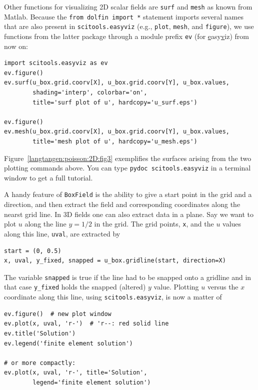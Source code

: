 Other functions for visualizing 2D scalar fields are {\fontsize{12pt}{12pt}\texttt{surf}} and
{\fontsize{12pt}{12pt}\texttt{mesh}} as known from Matlab. Because the {\fontsize{12pt}{12pt}\texttt{from dolfin import *}}
statement imports several names that are also present
in {\fontsize{12pt}{12pt}\texttt{scitools.easyviz}} (e.g., {\fontsize{12pt}{12pt}\texttt{plot}}, {\fontsize{12pt}{12pt}\texttt{mesh}}, and
{\fontsize{12pt}{12pt}\texttt{figure}}), we use functions from the latter package through a
module prefix {\fontsize{12pt}{12pt}\texttt{ev}} (for \underline{e}asy\underline{v}iz) from now on:
\begin{Verbatim}[fontsize=\fontsize{10pt}{10pt},tabsize=8,baselinestretch=1.05,
fontfamily=tt,xleftmargin=7mm]
import scitools.easyviz as ev
ev.figure()
ev.surf(u_box.grid.coorv[X], u_box.grid.coorv[Y], u_box.values,
        shading='interp', colorbar='on',
        title='surf plot of u', hardcopy='u_surf.eps')

ev.figure()
ev.mesh(u_box.grid.coorv[X], u_box.grid.coorv[Y], u_box.values,
        title='mesh plot of u', hardcopy='u_mesh.eps')
\end{Verbatim}
\noindent
Figure~\ref{langtangen:poisson:2D:fig3} exemplifies the surfaces arising from
the two plotting commands above.
You can type
{\fontsize{12pt}{12pt}\texttt{pydoc scitools.easyviz}} in a terminal window
to get a full tutorial.

A handy feature of {\fontsize{12pt}{12pt}\texttt{BoxField}} is the ability to give a start point
in the grid and a direction, and then extract the field and corresponding
coordinates along the nearst grid
line. In 3D fields
one can also extract data in a plane.
Say we
want to plot $u$ along the line $y=1/2$ in the grid. The grid points,
{\fontsize{12pt}{12pt}\texttt{x}}, and the
$u$ values along this line, {\fontsize{12pt}{12pt}\texttt{uval}}, are extracted by
\begin{Verbatim}[fontsize=\fontsize{10pt}{10pt},tabsize=8,baselinestretch=1.05,
fontfamily=tt,xleftmargin=7mm]
start = (0, 0.5)
x, uval, y_fixed, snapped = u_box.gridline(start, direction=X)
\end{Verbatim}
\noindent
The variable {\fontsize{12pt}{12pt}\texttt{snapped}} is true if the line had to be snapped onto a
gridline and in that case {\fontsize{12pt}{12pt}\verb!y_fixed!} holds the snapped
(altered) $y$ value.
Plotting $u$ versus the $x$ coordinate along this line, using
{\fontsize{12pt}{12pt}\texttt{scitools.easyviz}}, is now a matter of
\begin{Verbatim}[fontsize=\fontsize{10pt}{10pt},tabsize=8,baselinestretch=1.05,
fontfamily=tt,xleftmargin=7mm]
ev.figure()  # new plot window
ev.plot(x, uval, 'r-')  # 'r--: red solid line
ev.title('Solution')
ev.legend('finite element solution')

# or more compactly:
ev.plot(x, uval, 'r-', title='Solution',
        legend='finite element solution')
\end{Verbatim}
\noindent


